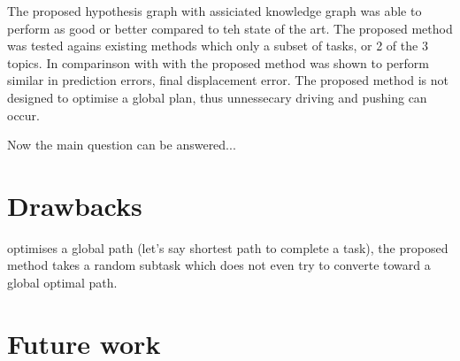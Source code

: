 The proposed hypothesis graph with assiciated knowledge graph was able to perform as good or better compared to teh state of the art. The proposed method was tested agains existing methods which only a subset of tasks, or 2 of the 3 topics. In comparinson with with\cite{sabbaghnovin_model_2021} the proposed method was shown to perform similar in prediction errors, final displacement error. The proposed method is not designed to optimise a global plan, thus unnessecary driving and pushing can occur. 
\vspace{\baselineskip}

Now the main question can be answered...


\section{Drawbacks}
\cite{vega-brown_asymptotically_2020} optimises a global path (let's say shortest path to complete a task), the proposed method takes a random subtask which does not even try to converte toward a global optimal path. 

\section{Future work}
\label{sec:future_work}

